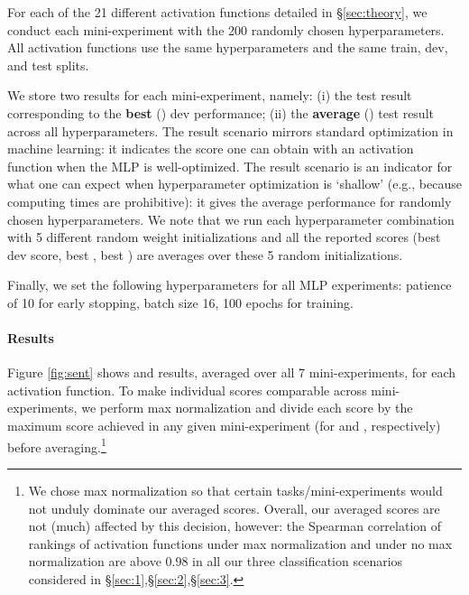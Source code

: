 For each of the 21 different activation functions detailed in \S\ref{sec:theory}, we conduct each mini-experiment with the 200 randomly chosen hyperparameters. All activation functions use the same hyperparameters and the same train, dev, and test splits.


We store two results for each mini-experiment, namely: (i) the test result corresponding to the \textbf{best} (\best) dev performance; (ii) the \textbf{average} (\avg) test result across all hyperparameters. The \best{} result scenario mirrors standard optimization in machine learning: it indicates the score one can obtain with an activation function when %
the MLP is well-optimized. The \avg{} result scenario is an indicator for what one can expect when hyperparameter optimization is `shallow' (e.g., because computing times are prohibitive): it gives the average performance for randomly chosen hyperparameters. We note that we run each hyperparameter combination %
with 5 different random weight initializations and all the reported scores (best dev score, best \best{}, best \avg{}) are averages over these 5 random initializations. 

Finally, we set the following hyperparameters for all MLP experiments: patience of 10 for early stopping, batch size 16, 100 epochs for training. 



\paragraph{Results}
Figure \ref{fig:sent} shows \best{} and \avg{} results, averaged over all 7 mini-experiments, for each activation function. To make individual scores comparable across mini-experiments, we perform max normalization and divide each score by the maximum score achieved in any given mini-experiment (for \best{} and \avg{}, respectively) before averaging.\footnote{We chose max normalization so that certain tasks/mini-experiments would not unduly dominate our averaged scores. Overall, our averaged scores are not (much) affected by this decision, however: the Spearman correlation of rankings of activation functions under max normalization and under no max normalization are above 0.98 in all our three classification scenarios considered in \S\ref{sec:1},\S\ref{sec:2},\S\ref{sec:3}.}

